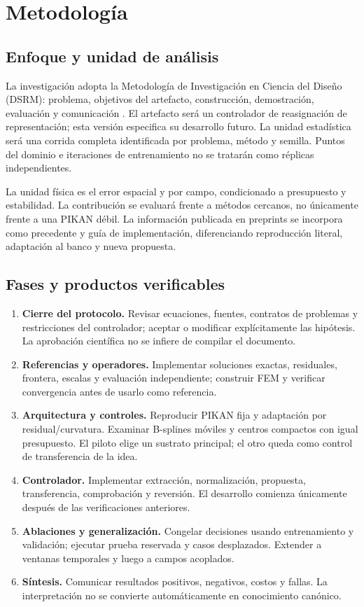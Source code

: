 \chapter{Metodología}
\label{sec:metodologia}
\section{Enfoque y unidad de análisis}
La investigación adopta la Metodología de Investigación en Ciencia del Diseño (DSRM): problema, objetivos del artefacto, construcción, demostración, evaluación y comunicación \cite{peffers2007dsrm}. El artefacto será un controlador de reasignación de representación; esta versión especifica su desarrollo futuro. La unidad estadística será una corrida completa identificada por problema, método y semilla. Puntos del dominio e iteraciones de entrenamiento no se tratarán como réplicas independientes.

La unidad física es el error espacial y por campo, condicionado a presupuesto y estabilidad. La contribución se evaluará frente a métodos cercanos, no únicamente frente a una PIKAN débil. La información publicada en preprints se incorpora como precedente y guía de implementación, diferenciando reproducción literal, adaptación al banco y nueva propuesta.

\section{Fases y productos verificables}
\begin{enumerate}
\item \textbf{Cierre del protocolo.} Revisar ecuaciones, fuentes, contratos de problemas y restricciones del controlador; aceptar o modificar explícitamente las hipótesis. La aprobación científica no se infiere de compilar el documento.
\item \textbf{Referencias y operadores.} Implementar soluciones exactas, residuales, frontera, escalas y evaluación independiente; construir FEM y verificar convergencia antes de usarlo como referencia.
\item \textbf{Arquitectura y controles.} Reproducir PIKAN fija y adaptación por residual/curvatura. Examinar B-splines móviles y centros compactos con igual presupuesto. El piloto elige un sustrato principal; el otro queda como control de transferencia de la idea.
\item \textbf{Controlador.} Implementar extracción, normalización, propuesta, transferencia, comprobación y reversión. El desarrollo comienza únicamente después de las verificaciones anteriores.
\item \textbf{Ablaciones y generalización.} Congelar decisiones usando entrenamiento y validación; ejecutar prueba reservada y casos desplazados. Extender a ventanas temporales y luego a campos acoplados.
\item \textbf{Síntesis.} Comunicar resultados positivos, negativos, costos y fallas. La interpretación no se convierte automáticamente en conocimiento canónico.
\end{enumerate}

